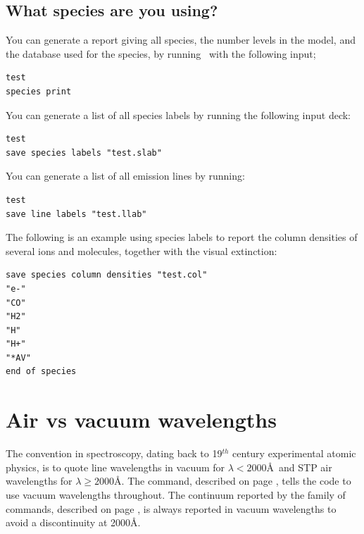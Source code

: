 \subsection{What species are you using?}

You can generate a report giving all species, the number levels in the model,
and the database used for the species,
by running \Cloudy\ with the following input;
\begin{verbatim}
test
species print
\end{verbatim}

You can generate a list of all species labels by running the following input deck:
\begin{verbatim}
test
save species labels "test.slab"
\end{verbatim}

You can generate a list of all emission lines by running:
\begin{verbatim}
test
save line labels "test.llab"
\end{verbatim}

The following is an example using species labels to report the column densities 
of several ions and molecules, together with the visual extinction:
\begin{verbatim}
save species column densities "test.col"
"e-"
"CO"
"H2"
"H"
"H+"
"*AV"
end of species
\end{verbatim}

\section{Air vs vacuum wavelengths}
\label{sec:AirVsVacuumWavelengths}
The convention in spectroscopy, dating back to 19$^{th}$ century experimental atomic physics,
is to quote line wavelengths in vacuum for  $\lambda < 2000$\AA\ and STP air wavelengths
for $\lambda \ge 2000$\AA.
The  command, 
described on page \pageref{sec:CommandPrintVacuum},
tells the code to use vacuum wavelengths throughout.
The continuum reported by the family of  commands,
described on page \pageref{sec:CommandSaveContinuum},
is always reported in vacuum wavelengths to avoid 
a discontinuity at 2000\AA.


